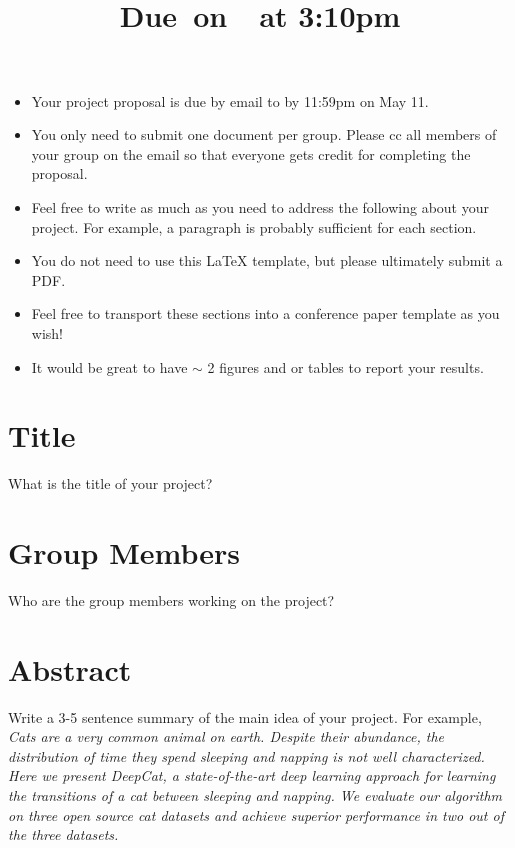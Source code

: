 \documentclass{article}
\title{
    \vspace{2in}
    \textmd{\textbf{\hmwkClass\hmwkTitle}}\\
    \normalsize\vspace{0.1in}\small{Due\ on\ \hmwkDueDate\ at 3:10pm}\\
    \vspace{3in}
}
\author{\hmwkAuthorName}
\date{}
\begin{document}

\begin{itemize}
\item Your project proposal is due by email to  by 11:59pm on May 11. 
\item You only need to submit one document per group. Please cc all members of your group on the email so that everyone gets credit for completing the proposal.  
\item Feel free to write as much as you need to address the following about your project. For example, a paragraph is probably sufficient for each section. 
\item You do not need to use this LaTeX template, but please ultimately submit a PDF. 
\item Feel free to transport these sections into a conference paper template as you wish!
\item It would be great to have $\sim$ 2 figures and or tables to report your results. 
\end{itemize}

\section{Title}

What is the title of your project?

\section{Group Members}

Who are the group members working on the project? 

\section{Abstract}

Write a 3-5 sentence summary of the main idea of your project. For example, \\

\emph{Cats are a very common animal on earth. Despite their abundance, the distribution of time they spend sleeping and napping is not well characterized. Here we present DeepCat, a state-of-the-art deep learning approach for learning the transitions of a cat between sleeping and napping. We evaluate our algorithm on three open source cat datasets and achieve superior performance in two out of the three datasets.}
\end{document}
